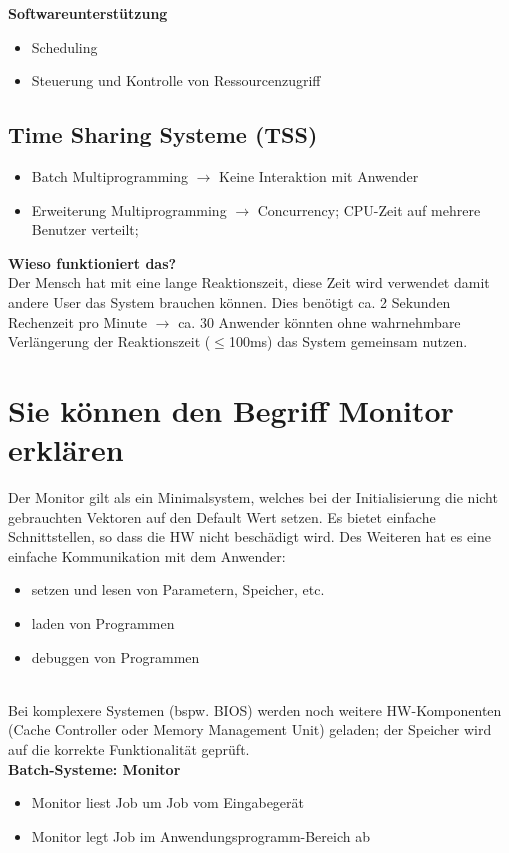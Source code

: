 \documentclass{report}
\theoremstyle{definition}
\theoremstyle{example}
\begin{document}
		\textbf{Softwareunterstützung}\\
		\begin{itemize}
			\item Scheduling
			\item Steuerung und Kontrolle von Ressourcenzugriff
		\end{itemize}
		
	\subsection{Time Sharing Systeme (TSS)}
		\begin{itemize}
			\item Batch Multiprogramming $\rightarrow$ Keine Interaktion mit Anwender
			\item Erweiterung Multiprogramming $\rightarrow$ Concurrency; CPU-Zeit auf mehrere Benutzer verteilt;
		\end{itemize}
		\textbf{Wieso funktioniert das?}\\
		Der Mensch hat mit eine lange Reaktionszeit, diese Zeit wird verwendet damit andere User das System brauchen können. Dies benötigt ca. 2 Sekunden Rechenzeit pro Minute $\rightarrow$ ca. 30 Anwender könnten ohne wahrnehmbare Verlängerung der Reaktionszeit ($\leq$100ms) das System gemeinsam nutzen.

	\section{Sie können den Begriff Monitor erklären}
Der Monitor gilt als ein Minimalsystem, welches bei der Initialisierung die nicht gebrauchten Vektoren auf den Default Wert setzen. Es bietet einfache Schnittstellen, so dass die HW nicht beschädigt wird.  Des Weiteren hat es eine einfache Kommunikation mit dem Anwender:
\begin{itemize}
	\item setzen und lesen von Parametern, Speicher, etc.
	\item laden von Programmen
	\item debuggen von Programmen
\end{itemize}
\\
Bei komplexere Systemen (bspw. BIOS) werden noch weitere HW-Komponenten (Cache Controller oder Memory Management Unit) geladen; der Speicher wird auf die korrekte Funktionalität geprüft.\\
\textbf{Batch-Systeme: Monitor}
\begin{itemize}
	\item Monitor liest Job um Job vom Eingabegerät
	\item Monitor legt Job im Anwendungsprogramm-Bereich ab
\end{itemize}
\end{document}
